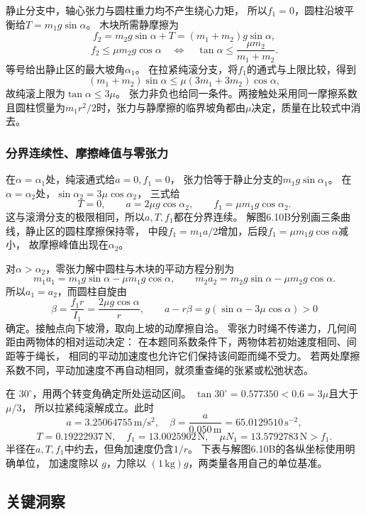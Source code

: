 \documentclass[UTF8,fontset=fandol,a4paper,11pt]{ctexart}
\begin{document}
静止分支中，轴心张力与圆柱重力均不产生绕心力矩，
所以$f_1=0$，圆柱沿坡平衡给$T=m_1g\sin\alpha$。
木块所需静摩擦为
\[
f_2=m_2g\sin\alpha+T=(m_1+m_2)g\sin\alpha,
\]
\[
f_2\leq\mu m_2g\cos\alpha
\quad\Longleftrightarrow\quad
\tan\alpha\leq\frac{\mu m_2}{m_1+m_2}.
\]
等号给出静止区的最大坡角$\alpha_1$。
在拉紧纯滚分支，将$f_1$的通式与上限比较，得到
\[
(m_1+m_2)\sin\alpha
\leq\mu(3m_1+3m_2)\cos\alpha,
\]
故纯滚上限为$\tan\alpha\leq3\mu$。
张力非负也给同一条件。两接触处采用同一摩擦系数且圆柱惯量为$m_1r^2/2$时，张力与静摩擦的临界坡角都由$\mu$决定，质量在比较式中消去。

\subsubsection*{分界连续性、摩擦峰值与零张力}
在$\alpha=\alpha_1$处，纯滚通式给$a=0,f_1=0$，
张力恰等于静止分支的$m_1g\sin\alpha_1$。
在$\alpha=\alpha_2$处，$\sin\alpha_2=3\mu\cos\alpha_2$，
三式给
\[
T=0,\qquad a=2\mu g\cos\alpha_2,\qquad
f_1=\mu m_1g\cos\alpha_2.
\]
这与滚滑分支的极限相同，所以$a,T,f_1$都在分界连续。
解图6.10B分别画三条曲线，静止区的圆柱摩擦保持零，
中段$f_1=m_1a/2$增加，后段$f_1=\mu m_1g\cos\alpha$减小，
故摩擦峰值出现在$\alpha_2$。

对$\alpha>\alpha_2$，零张力解中圆柱与木块的平动方程分别为
\[
m_1a_1=m_1g\sin\alpha-\mu m_1g\cos\alpha,
\qquad
m_2a_2=m_2g\sin\alpha-\mu m_2g\cos\alpha.
\]
所以$a_1=a_2$，而圆柱自旋由
\[
\beta=\frac{f_1r}{I_1}=\frac{2\mu g\cos\alpha}{r},
\qquad a-r\beta=g(\sin\alpha-3\mu\cos\alpha)>0
\]
确定。接触点向下坡滑，取向上坡的动摩擦自洽。
零张力时绳不传递力，几何间距由两物体的相对运动决定：
在本题同系数条件下，两物体若初始速度相同、间距等于绳长，
相同的平动加速度也允许它们保持该间距而绳不受力。
若两处摩擦系数不同，平动加速度不再自动相同，就须重查绳的张紧或松弛状态。

在 $30^\circ$，用两个转变角确定所处运动区间。
$\tan30^\circ=0.577350<0.6=3\mu$且大于$\mu/3$，
所以拉紧纯滚解成立。此时
\[
a=3.25064755\,\mathrm{m/s^2},\quad
\beta=\frac a{0.050\,\mathrm m}=65.0129510\,\mathrm{s^{-2}},
\]
\[
T=0.19222937\,\mathrm N,\quad f_1=13.0025902\,\mathrm N,
\quad \mu N_1=13.5792783\,\mathrm N>f_1.
\]
半径在$a,T,f_1$中约去，但角加速度仍含$1/r$。
下表与解图6.10B的各纵坐标使用明确单位，
加速度除以 $g$，力除以 $(1\,\mathrm{kg})g$，两类量各用自己的单位基准。




\subsection*{关键洞察}
\end{document}
